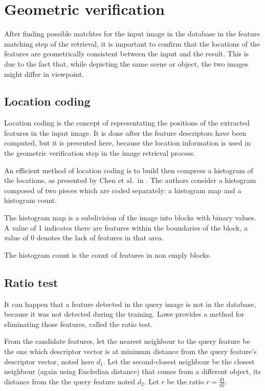 \section{Geometric verification}
\label{sec:geometric_verification}

After finding possible matchtes for the input image in the database in the feature matching step of the retrieval, it is important to confirm that the locations of the features are geometrically consistent between the input and the result. This is due to the fact that, while depicting the same scene or object, the two images might differ in viewpoint.

\subsection{Location coding}

Location coding is the concept of representating the positions of the extracted features in the input image. It is done after the feature descriptors have been computed, but it is presented here, because the location information is used in the geometric verification step in the image retrieval process.

An efficient method of location coding is to build then compress a histogram of the locations, as presented by Chen et al.\ in \cite{chen2010inverted}. The authors consider a histogram composed of two pieces which are coded separately: a histogram map and a histogram count.

The histogram map is a subdivision of the image into blocks with binary values. A value of 1 indicates there are features within the boundaries of the block, a value of 0 denotes the lack of features in that area.

The histogram count is the count of features in non emply blocks.

\subsection{Ratio test}

It can happen that a feature detected in the query image is not in the database, because it was not detected during the training. Lowe \cite{Lowe04distinctiveimage} provides a method for eliminating those features, called the ratio test.

From the candidate features, let the nearest neighbour to the query feature be the one which descriptor vector is at minimum distance from the query feature's descriptor vector, noted here $d_1$. Let the second-closest neighbour be the closest neighbour (again using Eucledian distance) that comes from a different object, its distance from the the query feature noted $d_2$. Let $r$ be the ratio $r = \frac{d1}{d2}$.

